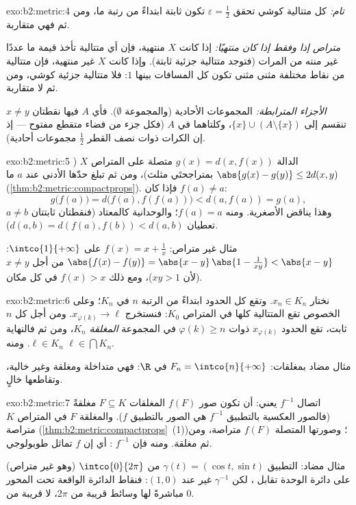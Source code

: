 \begin{solution}{exo:b2:metric:4}
\emph{تام:} كل متتالية كوشي تحقق $\varepsilon = \frac12$
تكون ثابتة ابتداءً من رتبة ما، ومن ثم فهي متقاربة.

\emph{متراص إذا وفقط إذا كان منتهيًا:} إذا كانت $X$ منتهية، فإن أي متتالية تأخذ قيمة ما
عددًا غير منته من المرات (فتوجد متتالية جزئية ثابتة). وإذا كانت $X$ غير منتهية،
فإن متتالية من نقاط مختلفة مثنى مثنى تكون كل المسافات بينها $1$:
فلا متتالية جزئية كوشي، ومن ثم لا متقاربة.

\emph{الأجزاء المترابطة:} المجموعات الأحادية (والمجموعة $\emptyset$). فأي $A$
فيها نقطتان $x \neq y$ تنقسم إلى $\{x\} \cup (A
\setminus\{x\})$، وكلتاهما  في $A$ (فكل جزء من فضاء متقطع
مفتوح --- إذ إن الكرات ذوات نصف القطر $\frac12$ مجموعات أحادية).
\end{solution}

\begin{solution}{exo:b2:metric:5}
الدالة $g(x) = d(x, f(x))$ متصلة على المتراص $X$
($\abs{g(x) - g(y)} \leq 2d(x,y)$ بمتراجحتَي مثلث)، ومن ثم
تبلغ حدّها الأدنى عند $a$ ما
(\cref{thm:b2:metric:compactprops}). فإذا كان $f(a) \neq a$:
\[
g\bigl(f(a)\bigr) = d\bigl(f(a), f(f(a))\bigr) < d(a, f(a)) = g(a),
\]
وهذا يناقض الأصغرية. ومنه $f(a) = a$؛ والوحدانية كالمعتاد (فنقطتان
ثابتتان $a \neq b$ تعطيان $d(a,b) = d(f(a), f(b)) < d(a,b)$).

مثال غير متراص: $f(x) = x + \frac1x$ على $\intco{1}{+\infty}$:
$\abs{f(x) - f(y)} = \abs{x - y}\,\abs{1 - \frac{1}{xy}} < \abs{x -
y}$ من أجل $x \neq y$ (لأن $xy > 1$)، ومع ذلك $f(x) > x$ في كل مكان.
\end{solution}

\begin{solution}{exo:b2:metric:6}
نختار $x_n \in K_n$. وتقع كل الحدود ابتداءً من الرتبة $n$ في $K_n$؛ وعلى
الخصوص تقع المتتالية كلها في المتراص $K_0$: فنستخرج
$x_{\varphi(k)} \to \ell$. ومن أجل كل $n$ ثابت، تقع الحدود
$x_{\varphi(k)}$ ذوات $\varphi(k) \geq n$ في المجموعة \emph{المغلقة}
$K_n$، ومن ثم فالنهاية $\ell \in K_n$. ومنه $\ell \in \bigcap K_n$.

مثال مضاد بمغلقات: $F_n = \intco{n}{+\infty}$ في $\R$: فهي متداخلة
ومغلقة وغير خالية، وتقاطعها خالٍ.
\end{solution}

\begin{solution}{exo:b2:metric:7}
اتصال $f^{-1}$ يعني: أن تكون صور $f(F)$ المغلقات $F
\subseteq K$ مغلقةً (فالصور العكسية بالتطبيق $f^{-1}$ هي الصور بالتطبيق
$f$). والمغلقة $F$ في المتراص $K$ متراصة
(\cref{thm:b2:metric:compactprops}~(1))؛ وصورتها المتصلة
$f(F)$ متراصة، ومن ثم مغلقة. ومنه فإن $f^{-1}$ : أي إن $f$
تماثل طوبولوجي.

مثال مضاد: التطبيق $\gamma(t) = (\cos t, \sin t)$ من
$\intco{0}{2\pi}$ (وهو غير متراص) على دائرة الوحدة تقابل
، لكن $\gamma^{-1}$ غير  عند $(1,0)$:
فنقاط الدائرة الواقعة تحت المحور مباشرةً لها وسائط قريبة من
$2\pi$، لا قريبة من $0$.
\end{solution}


